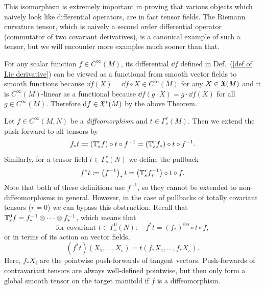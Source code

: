 \begin{rem}
    This isomorphism is extremely important in proving that various objects which naively look like differential operators, are in fact tensor fields. The Riemann curvature tensor, which is naively a second order differential operator (commutator of two covariant derivatives), is a canonical example of such a tensor, but we will encounter more examples much sooner than that.
\end{rem}


\begin{example}[$\dd f$ is a $1$-form]\label{df is a 1-form}
    For any scalar function $f\in C^\infty(M)$, its differential $\dd f$ defined in Def.\ (\ref{def of Lie derivative}) can be viewed as a functional from smooth vector fields to smooth functions because $\dd f(X)=\dd f\circ X\in C^\infty(M)$ for any $X\in\mathfrak{X}(M)$ and it is $C^\infty(M)$-linear as a functional because $\dd f(g\cdot X)=g\cdot \dd f(X)$ for all $g\in C^\infty(M)$. Therefore ${\mathrm{d}} f\in \mathfrak{X}^\ast(M)$ by the above Theorem.
\end{example}

\begin{defn}
    Let $f\in C^\infty(M,N)$ be a \emph{diffeomorphism} and $t\in \Gamma^r_s(M)$. Then we extend the push-forward to all tensors by
    \[
    f_\ast t\coloneqq (\mathbb{T}^r_sf)\circ t\circ f^{-1}=(\mathbb{T}^r_s f_\ast)\circ t\circ f^{-1}.\label{eq pushforward formula}
    \]
    Similarly, for a tensor field $t\in \Gamma^r_s(N)$ we define the pullback
    \[
    f^\ast t\coloneqq \left(f^{-1}\right)_\ast t=\left(\mathbb{T}^r_s f^{-1}_\ast\right)\circ t\circ f.\label{eq pullback formula}
    \]
    Note that both of these definitions use $f^{-1}$, so they cannot be extended to non-diffeomorphisms in general. However, in the case of pullbacks of totally covariant tensors ($r=0$) we can bypass this obstruction. Recall that $\mathbb{T}^0_s f=f_\ast^{-1}\otimes\cdots\otimes f_\ast^{-1}$, which means that
    \[
    \text{for covariant }t\in \Gamma^0_s(N):\quad f^\ast t= (f_\ast)^{\otimes s}\circ t\circ f,
    \]
    or in terms of its action on vector fields,
    \[
    (f^\ast t)(X_1,\ldots,X_s)=t(f_\ast X_1,\ldots,f_\ast X_s).
    \]
    Here, $f_\ast X_i$ are the pointwise push-forwards of tangent vectors. Push-forwards of contravariant tensors are always well-defined pointwise, but then only form a global smooth tensor on the target manifold if $f$ is a diffeomorphism.
\end{defn}

